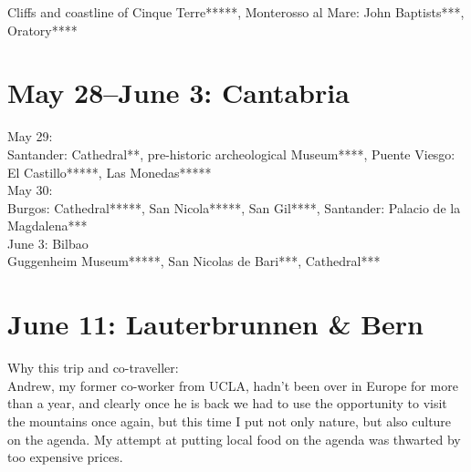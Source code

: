 Cliffs and coastline of Cinque Terre*****, Monterosso al Mare: John Baptists***, Oratory****

\section{May 28--June 3: Cantabria}
\label{Spain2016}

May 29:\\
Santander: Cathedral**, pre-historic archeological Museum****, Puente Viesgo: El Castillo*****, Las Monedas*****\\

May 30:\\
Burgos: Cathedral*****, San Nicola*****, San Gil****, Santander: Palacio de la Magdalena***\\

June 3: Bilbao\\
Guggenheim Museum*****, San Nicolas de Bari***, Cathedral***

\section{June 11: Lauterbrunnen \& Bern}
\label{LauterbrunnenBern2016}

Why this trip and co-traveller:\\
Andrew, my former co-worker from UCLA, hadn't been over in Europe for more than a year, and clearly once he is back we had to use the opportunity to visit the mountains once again, but this time I put not only nature, but also culture on the agenda. My attempt at putting local food on the agenda was thwarted by too expensive prices.\\

